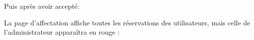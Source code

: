 \documentclass{article}
\begin{document}
\begin{enumerate}
               \noindent{}  
  
  \vspace{2cm}
  Puis après avoir accepté:
  
  \vspace{0.7cm}
               \hspace*{-0.7in}

               \noindent{}
  
  \newpage 
  La page d'affectation affiche toutes les réservations des utilisateurs, mais celle de l'administrateur apparaîtra en rouge :
  
  \vspace{0.7cm}
               \hspace*{-0.7in}
               \noindent{}
               

\end{enumerate}
\end{document}
